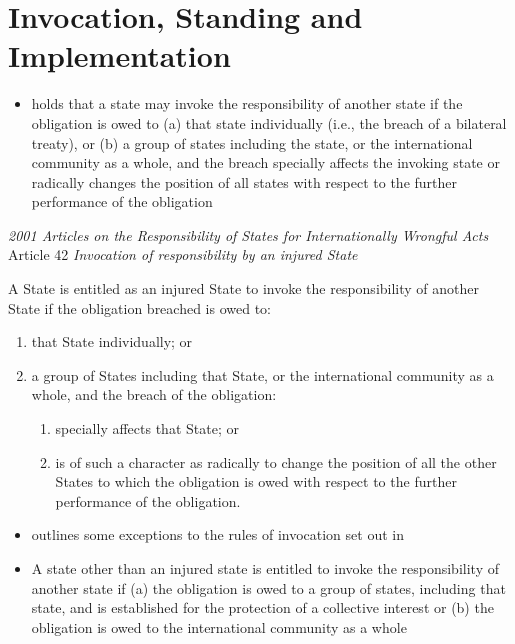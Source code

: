 \section{Invocation, Standing and Implementation}
\begin{itemize}
    \item {} holds that a state may invoke the responsibility of another state if the obligation is owed to (a) that state individually (i.e., the breach of a bilateral treaty), or (b) a group of states including the state, or the international community as a whole, and the breach specially affects the invoking state or radically changes the position of all states with respect to the further performance of the obligation
\end{itemize}
\begin{conventiondetails}{\textit{2001 Articles on the Responsibility of States for Internationally Wrongful Acts} Article 42}
    \flushleft
    \textit{Invocation of responsibility by an injured State}

    \vspace{\baselineskip}

    A State is entitled as an injured State to invoke the responsibility of another State if the obligation breached is owed to:
    \begin{enumerate}[label=(\alph*)]
        \item that State individually; or
        \item a group of States including that State, or the international community as a whole, and the breach of the obligation:
        \begin{enumerate}[label=(\roman*)]
            \item specially affects that State; or
            \item is of such a character as radically to change the position of all the other States to which the obligation is owed with respect to the further performance of the obligation.
        \end{enumerate}
    \end{enumerate}
\end{conventiondetails}

\begin{itemize}
    \item {} outlines some exceptions to the rules of invocation set out in 
    \item A state other than an injured state is entitled to invoke the responsibility of another state if (a) the obligation is owed to a group of states, including that state, and is established for the protection of a collective interest or (b) the obligation is owed to the international community as a whole
\end{itemize}

